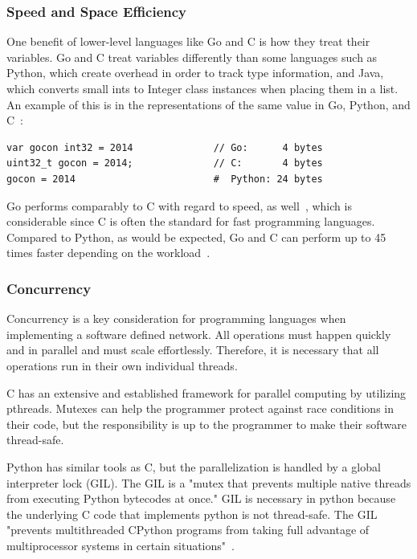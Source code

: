 \documentclass[10pt,letterpaper,onecolumn,draftclsnofoot]{IEEEtran}
\begin{document}
\subsubsection{Speed and Space Efficiency}

One benefit of lower-level languages like Go and C is how they treat their
variables. Go and C treat variables differently than some languages such as
Python, which create overhead in order to track type information, and Java,
which converts small ints to Integer class instances when placing them in a
list. An example of this is in the representations of the same value in Go,
Python, and C~\cite{davecheney}:

\begin{lstlisting}
var gocon int32 = 2014              // Go:      4 bytes
uint32_t gocon = 2014;              // C:       4 bytes
gocon = 2014                        #  Python: 24 bytes
\end{lstlisting}

Go performs comparably to C with regard to speed, as well~\cite{benchmarks},
which is considerable since C is often the standard for fast programming
languages. Compared to Python, as would be expected, Go and C can perform up to
45 times faster depending on the workload~\cite{benchmarks}.

\subsubsection{Concurrency}

Concurrency is a key consideration for programming languages when implementing a
software defined network. All operations must happen quickly and in parallel and
must scale effortlessly. Therefore, it is necessary that all operations run in
their own individual threads.

C has an extensive and established framework for parallel computing by utilizing
pthreads. Mutexes can help the programmer protect against race conditions in
their code, but the responsibility is up to the programmer to make their
software thread-safe.

Python has similar tools as C, but the parallelization is handled by a global
interpreter lock (GIL). The GIL is a "mutex that prevents multiple native
threads from executing Python bytecodes at once." GIL is necessary in python
because the underlying C code that implements python is not thread-safe. The GIL
"prevents multithreaded CPython programs from taking full advantage of
multiprocessor systems in certain situations"~\cite{GIL}.
\end{document}
